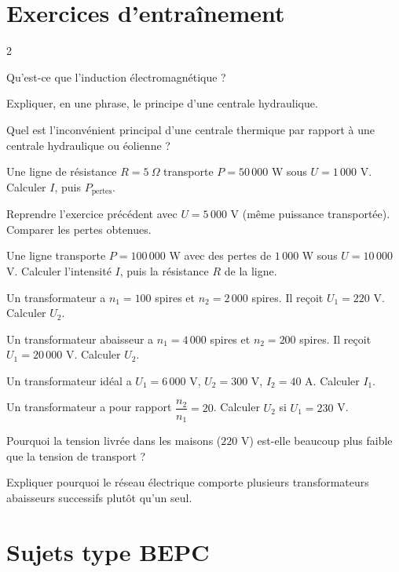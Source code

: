 \section{Exercices d'entraînement}
\begin{multicols}{2}

\exo{} Qu'est-ce que l'induction électromagnétique ?

\exo{} Expliquer, en une phrase, le principe d'une centrale hydraulique.

\exo{} Quel est l'inconvénient principal d'une centrale thermique par rapport à
une centrale hydraulique ou éolienne ?

\exo{} Une ligne de résistance $R=5\ \Omega$ transporte $P=50\,000$ W sous
$U=1\,000$ V. Calculer $I$, puis $P_{\text{pertes}}$.

\exo{} Reprendre l'exercice précédent avec $U=5\,000$ V (même puissance
transportée). Comparer les pertes obtenues.

\exo{} Une ligne transporte $P=100\,000$ W avec des pertes de $1\,000$ W sous
$U=10\,000$ V. Calculer l'intensité $I$, puis la résistance $R$ de la ligne.

\exo{} Un transformateur a $n_1=100$ spires et $n_2=2\,000$ spires. Il reçoit
$U_1=220$ V. Calculer $U_2$.

\exo{} Un transformateur abaisseur a $n_1=4\,000$ spires et $n_2=200$ spires. Il
reçoit $U_1=20\,000$ V. Calculer $U_2$.

\exo{} Un transformateur idéal a $U_1=6\,000$ V, $U_2=300$ V, $I_2=40$ A. Calculer
$I_1$.

\exo{} Un transformateur a pour rapport $\dfrac{n_2}{n_1}=20$. Calculer $U_2$ si
$U_1=230$ V.

\exo{} Pourquoi la tension livrée dans les maisons ($220$ V) est-elle beaucoup
plus faible que la tension de transport ?

\exo{} Expliquer pourquoi le réseau électrique comporte plusieurs transformateurs
abaisseurs successifs plutôt qu'un seul.

\end{multicols}

\section{Sujets type BEPC}

